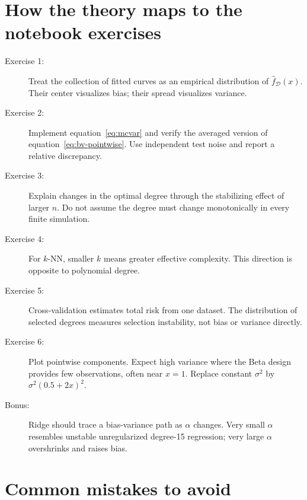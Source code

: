 \documentclass[11pt,a4paper]{article}
\begin{document}
\section{How the theory maps to the notebook exercises}
\label{sec:map}

\begin{description}
  \item[Exercise 1:] Treat the collection of fitted curves as an empirical distribution of $\widehat f_{\mathcal D}(x)$. Their center visualizes bias; their spread visualizes variance.
  \item[Exercise 2:] Implement equation~\eqref{eq:mcvar} and verify the averaged version of equation~\eqref{eq:bv-pointwise}. Use independent test noise and report a relative discrepancy.
  \item[Exercise 3:] Explain changes in the optimal degree through the stabilizing effect of larger $n$. Do not assume the degree must change monotonically in every finite simulation.
  \item[Exercise 4:] For $k$-NN, smaller $k$ means greater effective complexity. This direction is opposite to polynomial degree.
  \item[Exercise 5:] Cross-validation estimates total risk from one dataset. The distribution of selected degrees measures selection instability, not bias or variance directly.
  \item[Exercise 6:] Plot pointwise components. Expect high variance where the Beta design provides few observations, often near $x=1$. Replace constant $\sigma^2$ by $\sigma^2(0.5+2x)^2$.
  \item[Bonus:] Ridge should trace a bias-variance path as $\alpha$ changes. Very small $\alpha$ resembles unstable unregularized degree-15 regression; very large $\alpha$ overshrinks and raises bias.
\end{description}

\section{Common mistakes to avoid}
\end{document}
